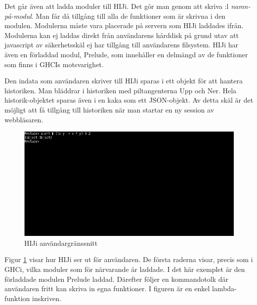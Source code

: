 Det går även att ladda moduler till HIJi. Det gör man genom att skriva :l \emph{namn-på-modul}. Man får då tillgång till alla de funktioner som är skrivna i den modulen. Modulerna måste vara placerade på servern som HIJi laddades ifrån. Modulerna kan ej laddas direkt från användarens hårddisk på grund utav att javascript av säkerhetsskäl ej har tillgång till användarens filsystem. HIJi har även en förladdad modul, Prelude, som innehåller en delmängd av de funktioner som finns i GHCIs motsvarighet. 

Den indata som användaren skriver till HIJi sparas i ett objekt för att hantera historiken. Man bläddrar i historiken med piltangenterna Upp och Ner. Hela historik-objektet sparas även i en kaka som ett JSON-objekt. Av detta skäl är det möjligt att få tillgång till historiken när man startar en ny session av webbläsaren.


\begin{figure}[H]
    \begin{center}
        \includegraphics[width=1\textwidth]{hiji_screen3.png}
        \caption{HIJi användargränssnitt}
        \label{fig:hiji} %
    \end{center}
\end{figure}

Figur \ref{fig:hiji} visar hur HIJi ser ut för användaren. De första raderna visar, precis som i GHCi, vilka moduler som för närvarande är laddade. I det här exemplet är den förladdade modulen Prelude laddad. Därefter följer en kommandotolk där användaren fritt kan skriva in egna funktioner. I figuren är en enkel lambda-funktion inskriven.


